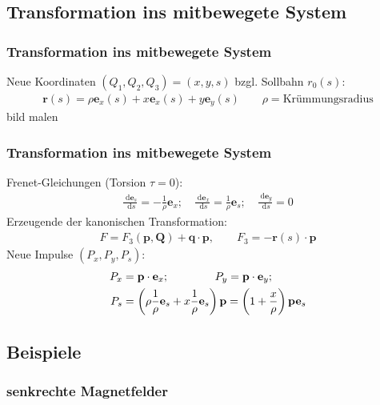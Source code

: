 \documentclass[hyperref={pdfpagelabels=false}]{beamer}
\newcommand {\dx} {\; \mathrm{d} }              %
\begin{document}
\subsection{Transformation ins mitbewegete System}
\begin{frame}
\frametitle{Transformation ins mitbewegete System}
\pause
Neue Koordinaten $(Q_1,Q_2,Q_3) = (x,y,s)$ bzgl. Sollbahn $r_0(s)$:
\begin{align*}
 \mathbf{r}(s) = \rho\mathbf{e}_x(s) + x\mathbf{e}_x(s) + y\mathbf{e}_y(s) \qquad \rho = \text{Krümmungsradius}
\end{align*}
bild malen

\end{frame}

\begin{frame}
 \frametitle{Transformation ins mitbewegete System}
 \pause
 Frenet-Gleichungen (Torsion $\tau=0$):
 \begin{align*}
  \frac{\dx \mathbf{e}_s}{\dx s} = -\frac{1}{\rho}\mathbf{e}_x;\quad\frac{\dx \mathbf{e}_x}{\dx s} = \frac{1}{\rho}\mathbf{e}_s;\quad\frac{\dx \mathbf{e}_y}{\dx s} = 0
 \end{align*}
 Erzeugende der kanonischen Transformation:
 \begin{align*}
  F = F_3(\mathbf{p},\mathbf{Q}) + \mathbf{q}\cdot\mathbf{p}, \qquad F_3 = -\mathbf{r}(s)\cdot\mathbf{p}
 \end{align*}
 Neue Impulse $(P_x, P_y,P_s)$:
 \begin{align*}
  P_x &= \mathbf{p}\cdot\mathbf{e}_x; \hspace{1.45cm} P_y = \mathbf{p}\cdot\mathbf{e}_y;\\
  P_s &= \left(\rho\frac{1}{\rho}\mathbf{e}_s+x\frac{1}{\rho}\mathbf{e}_s\right)\mathbf{p} = \left(1+\frac{x}{\rho}\right)\mathbf{p}\mathbf{e}_s
 \end{align*}



\end{frame}


\subsection{Beispiele}
\begin{frame}
\frametitle{senkrechte Magnetfelder}
 \pause
 \begin{itemize}
 \end{itemize}
\end{frame}
\end{document}
